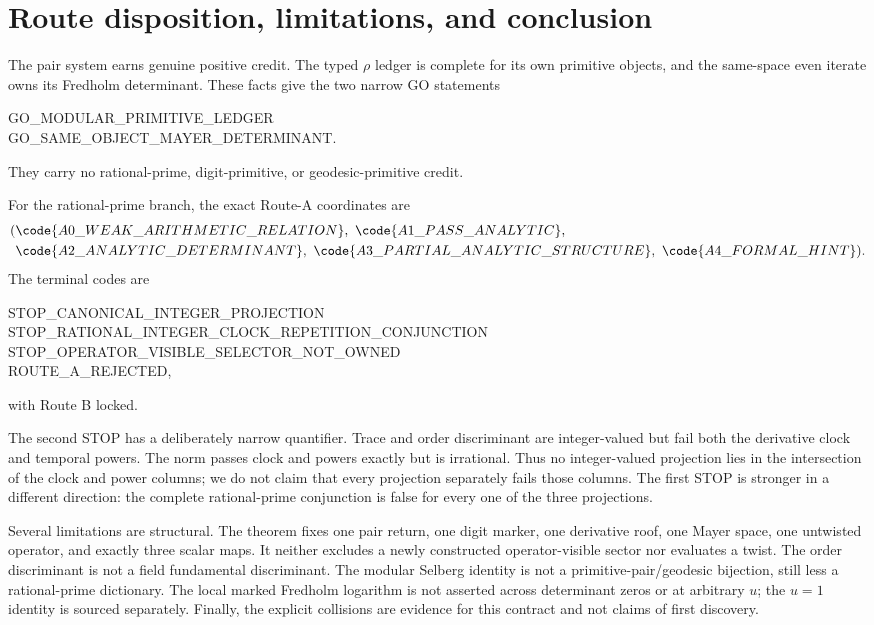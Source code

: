 \section{Route disposition, limitations, and conclusion}
\label{sec:route}

The pair system earns genuine positive credit.  The typed $\rho$ ledger is
complete for its own primitive objects, and the same-space even iterate owns
its Fredholm determinant.  These facts give the two narrow GO statements
\begin{center}
\small\ttfamily
GO\_MODULAR\_PRIMITIVE\_LEDGER\\
GO\_SAME\_OBJECT\_MAYER\_DETERMINANT.
\end{center}
They carry no rational-prime, digit-primitive, or geodesic-primitive credit.

For the rational-prime branch, the exact Route-A coordinates are
\begin{equation*}
\begin{aligned}
(&\code{A0\_WEAK\_ARITHMETIC\_RELATION},
\ \code{A1\_PASS\_ANALYTIC},\\
 &\code{A2\_ANALYTIC\_DETERMINANT},
\ \code{A3\_PARTIAL\_ANALYTIC\_STRUCTURE},
\ \code{A4\_FORMAL\_HINT}).
\end{aligned}
\end{equation*}
The terminal codes are
\begin{center}
\small\ttfamily
STOP\_CANONICAL\_INTEGER\_PROJECTION\\
STOP\_RATIONAL\_INTEGER\_CLOCK\_REPETITION\_CONJUNCTION\\
STOP\_OPERATOR\_VISIBLE\_SELECTOR\_NOT\_OWNED\\
ROUTE\_A\_REJECTED,
\end{center}
with Route B locked.

The second STOP has a deliberately narrow quantifier.  Trace and order
discriminant are integer-valued but fail both the derivative clock and
temporal powers.  The norm passes clock and powers exactly but is irrational.
Thus no integer-valued projection lies in the intersection of the clock and
power columns; we do not claim that every projection separately fails those
columns.  The first STOP is stronger in a different direction: the complete
rational-prime conjunction is false for every one of the three projections.

Several limitations are structural.  The theorem fixes one pair return, one
digit marker, one derivative roof, one Mayer space, one untwisted operator,
and exactly three scalar maps.  It neither excludes a newly constructed
operator-visible sector nor evaluates a twist.  The order discriminant is
not a field fundamental discriminant.  The modular Selberg identity is not a
primitive-pair/geodesic bijection, still less a rational-prime dictionary.
The local marked Fredholm logarithm is not asserted across determinant zeros
or at arbitrary $u$; the $u=1$ identity is sourced separately.  Finally, the
explicit collisions are evidence for this contract and not claims of first
discovery.

